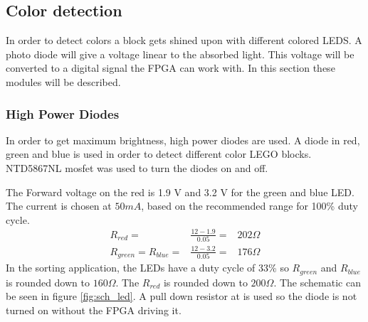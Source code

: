 \subsection{Color detection}
In order to detect colors a block gets shined upon with different colored LEDS.
A photo diode will give a voltage linear to the absorbed light.
This voltage will be converted to a digital signal the FPGA can work with.
In this section these modules will be described.
\subsubsection{High Power Diodes}
In order to get maximum brightness, high power diodes are used.
A diode in red, green and blue is used in order to detect different color LEGO blocks.
NTD5867NL mosfet was used to turn the diodes on and off.

The Forward voltage on the red is 1.9 V and 3.2 V for the green and blue LED\cite{ds:red_led,ds:gb_led}.
The current is chosen at $50 mA$, based on the recommended range for 100\% duty cycle\cite[p. 2]{apnote:led}.
\begin{eqnarray}
 R_{red} =& \frac{12-1.9}{0.05} =& 202 \Omega \nonumber \\
 R_{green} = R_{blue} =& \frac{12-3.2}{0.05} =& 176 \Omega \nonumber 
\end{eqnarray}
In the sorting application, the LEDs have a duty cycle of 33\% so $R_{green}$ and $R_{blue}$ is rounded down to $160 \Omega$.
The $R_{red}$ is rounded down to $200\Omega$.
The schematic can be seen in figure \ref{fig:sch_led}.
A pull down resistor at is used so the diode is not turned on without the FPGA driving it.

